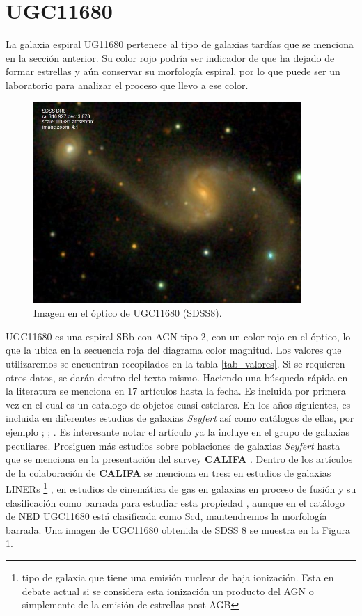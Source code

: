  \section{UGC11680}

 La galaxia espiral UG11680 pertenece al tipo de galaxias tardías que se menciona en la sección anterior. Su color rojo podría ser
 indicador de que ha dejado de formar estrellas y aún conservar su morfología espiral, por lo que puede ser un laboratorio para analizar
 el proceso que llevo a ese color.

 \begin{figure}[!ht]
   \centering
   \includegraphics[width=4in]{ugc11680.jpg}
   \caption[ Imagen de UGC11680]
    {Imagen en el óptico de UGC11680 (SDSS8).}
 \label{ugc11680}
 \end{figure}


 \noindent UGC11680 es una espiral SBb con AGN tipo 2, con un color rojo en el óptico, lo que la ubica en la secuencia roja del diagrama color magnitud. Los valores que utilizaremos se encuentran recopilados en la tabla \ref{tab_valores}. Si se requieren otros datos, se darán dentro del texto mismo. Haciendo una búsqueda rápida en la literatura se menciona en 17 artículos hasta la fecha.
 Es incluida por primera vez en \citet{hewitt1991} el cual es un catalogo de objetos cuasi-estelares.
 En los años siguientes, es incluida en diferentes estudios de galaxias \textsl{Seyfert} así
 como catálogos de ellas, por ejemplo \citep{thean2000}; \citep{klimanov2001}; \citep{tran2003}. Es interesante notar el artículo  \citet{moustakas2006}  ya la incluye en el grupo de galaxias peculiares. Prosiguen más estudios sobre poblaciones de galaxias \textsl{Seyfert} hasta que se menciona en la presentación del survey \textbf{CALIFA} \citep{sanchez2012}. Dentro de los artículos de la colaboración de \textbf{CALIFA} se menciona en tres: en estudios de galaxias LINERs \footnote{tipo de galaxia que tiene una emisión nuclear de baja ionización. Esta en debate actual si se considera esta ionización un producto del AGN o simplemente de la emisión de estrellas post-AGB} \citep{singh2013}, en estudios de cinemática de gas en galaxias en proceso de fusión \citep{barrera2015} y su clasificación como barrada para estudiar esta propiedad \citep{blazquez2007}, aunque en el catálogo de NED  UGC11680 está clasificada como Scd, mantendremos la morfología barrada. Una imagen de UGC11680 obtenida de SDSS 8 se muestra en la Figura \ref{ugc11680}.

